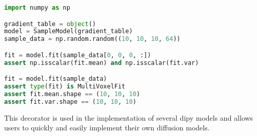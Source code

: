 \begin{lstlisting}[language=python]
import numpy as np

gradient_table = object()
model = SampleModel(gradient_table)
sample_data = np.random.random((10, 10, 10, 64))

fit = model.fit(sample_data[0, 0, 0, :])
assert np.isscalar(fit.mean) and np.isscalar(fit.var)

fit = model.fit(sample_data)
assert type(fit) is MultiVoxelFit
assert fit.mean.shape == (10, 10, 10)
assert fit.var.shape == (10, 10, 10)
\end{lstlisting}

This decorator is used in the implementation of several dipy models and allows users to quickly and easily implement their own diffusion models.
